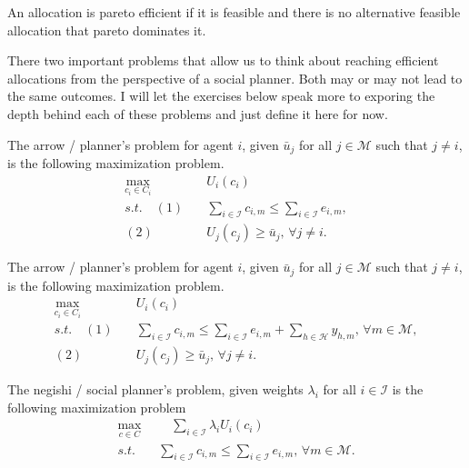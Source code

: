 \documentclass[11pt,english]{article}
\begin{document}
\begin{definition}
An allocation is pareto efficient if it is feasible and there is no alternative feasible allocation that pareto dominates it.
\end{definition}

There two important problems that allow us to think about reaching efficient allocations from the perspective of a social planner. Both may or may not lead to the same outcomes. I will let the exercises below speak more to exporing the depth behind each of these problems and just define it here for now.

\begin{definition}
The arrow / planner's problem for agent $i$, given $\bar{u}_j$ for all $j\in \mathcal{M}$ such that $j\neq i$, is the following maximization problem.
\begin{align*}
\max_{c_i\in C_i}&\quad U_i(c_i)\\
s.t.\quad (1)&\quad \sum_{i\in \mathcal{I}}c_{i,m} \leq  \sum_{i\in \mathcal{I}}e_{i,m} ,\\
(2)&\quad U_j(c_j) \geq \bar{u}_j,\, \forall j\neq i.
\end{align*}
\end{definition}

\begin{definition}
The arrow / planner's problem for agent $i$, given $\bar{u}_j$ for all $j\in \mathcal{M}$ such that $j\neq i$, is the following maximization problem.
\begin{align*}
\max_{c_i\in C_i}&\quad U_i(c_i)\\
s.t.\quad (1)&\quad \sum_{i\in \mathcal{I}}c_{i,m} \leq  \sum_{i\in \mathcal{I}}e_{i,m} + \sum_{h\in \mathcal{H}} y_{h,m},\,\forall m\in \mathcal{M},\\
(2)&\quad U_j(c_j) \geq \bar{u}_j,\, \forall j\neq i.
\end{align*}
\end{definition}

\begin{definition}
The negishi / social planner's problem, given weights $\lambda_i$ for all $i\in \mathcal{I}$ is the following maximization problem
\begin{align*}
\max_{c\in C}&\quad \sum_{i\in \mathcal{I}} \lambda_iU_i(c_i)\\
s.t.\quad & \sum_{i\in \mathcal{I}}c_{i,m} \leq  \sum_{i\in \mathcal{I}}e_{i,m},\,\forall m\in \mathcal{M}.
\end{align*}
\end{definition}
\end{document}
